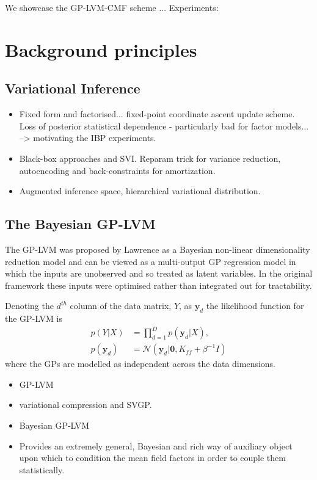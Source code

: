 \documentclass{article}
\begin{document}
We showcase the GP-LVM-CMF scheme ...
Experiments:

\section{Background principles}
\label{sec:background}

\subsection{Variational Inference}
\label{subsec:vi}

\begin{itemize}
  \item Fixed form and factorised... fixed-point coordinate ascent update scheme. Loss of posterior statistical dependence - particularly bad for factor models... --> motivating the IBP experiments.
  \item Black-box approaches and SVI. Reparam trick for variance reduction, autoencoding and back-constraints for amortization.
  \item Augmented inference space, hierarchical variational distribution.
\end{itemize}

\subsection{The Bayesian GP-LVM}
\label{subsec:gplvm}

The GP-LVM was proposed by Lawrence as a Bayesian non-linear dimensionality reduction model and can be viewed as a multi-output GP regression model in which the inputs are unobserved and so treated as latent variables. In the original framework these inputs were optimised rather than integrated out for tractability.

Denoting the $d^{th}$ column of the data matrix, $Y$, as $\mathbf{y}_d$ the likelihood function for the GP-LVM is
%
\begin{align}
  p(Y|X) &= \prod_{d=1}^D p(\mathbf{y}_d | X),\\
  p(\mathbf{y}_d) &= \mathcal{N}(\mathbf{y}_d|\mathbf{0}, K_{ff}+\beta^{-1}I)
\end{align}
%
where the GPs are modelled as independent across the data dimensions.

\begin{itemize}
  \item GP-LVM
  \item variational compression and SVGP.
  \item Bayesian GP-LVM
  \item Provides an extremely general, Bayesian and rich way of auxiliary object upon which to condition the mean field factors in order to couple them statistically.
\end{itemize}
\end{document}
